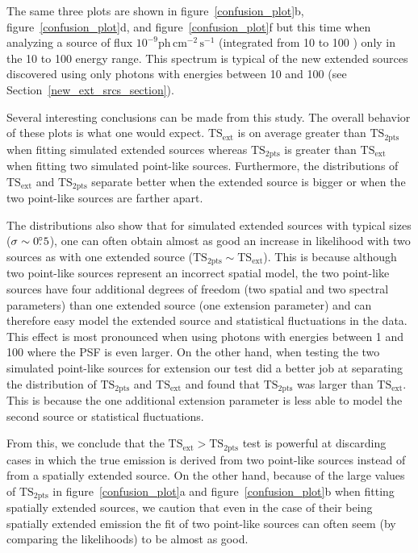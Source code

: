 \documentclass[12pt,preprint]{aastex}
\newcommand{\gev}{\text{GeV}\xspace}
\newcommand{\phflux}{\ensuremath{\text{ph}\,\text{cm}^{-2}\,\text{s}^{-1}}\xspace}
\newcommand{\tsext}{{\ensuremath{\text{TS}_{\text{ext}}}}\xspace}
\newcommand{\tsinc}{\ensuremath{\text{TS}_{\text{2pts}}}\xspace}
\begin{document}
The same three plots are shown in figure~\ref{confusion_plot}b,
figure~\ref{confusion_plot}d, and figure~\ref{confusion_plot}f but this
time when analyzing a source of flux $10^{-9} \phflux$ (integrated from
10 \gev to 100 \gev) only in the 10 \gev to 100 \gev energy range.
This spectrum is typical of the new extended sources discovered
using only photons with energies between 10 \gev and 100 \gev (see
Section~\ref{new_ext_srcs_section}).

Several interesting conclusions can be made from this study. The overall
behavior of these plots is what one would expect. \tsext is on average
greater than \tsinc when fitting simulated extended sources whereas
\tsinc is greater than \tsext when fitting two simulated point-like sources.
Furthermore, the distributions of \tsext and \tsinc separate better
when the extended source is bigger or when the two point-like sources are
farther apart.

The distributions also show that for simulated
extended sources with typical
sizes ($\sigma\sim0\mbox{$.\!\!^\circ$}5$), one can often obtain almost as good 
an increase in likelihood
with two sources as with one extended source ($\tsinc\sim\tsext$).
This is because although
two point-like sources represent an incorrect spatial model, 
the two point-like sources have four additional degrees
of freedom (two spatial and two spectral parameters)
than one extended source (one extension parameter)
and can therefore easy model
the extended source and statistical fluctuations in the data.
This effect is most pronounced when using photons with energies between 1
\gev and 100 \gev where the PSF is even larger.  
On the other hand,
when testing the two simulated point-like sources for extension our test
did a better job at separating the distribution of \tsinc and \tsext
and found that \tsinc was larger than \tsext.
This is because the one additional extension parameter is less able to
model the second source or statistical fluctuations.

From this, we conclude that the $\tsext>\tsinc$ test is 
powerful at discarding cases in which the true emission is derived
from two point-like sources instead of from a spatially extended
source. On the other hand, because of the large values of \tsinc
in figure~\ref{confusion_plot}a and figure~\ref{confusion_plot}b when
fitting spatially extended sources, we caution that even in the case of
their being spatially extended emission the fit of two point-like sources
can often seem (by comparing the likelihoods) to be almost as good.
\end{document}
